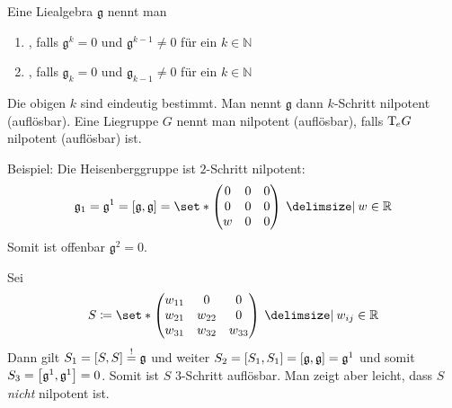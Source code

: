 \begin{definition}
	Eine Liealgebra $\mathfrak{g}$ nennt man
	\begin{enumerate}[1)]
		\item {}, falls $\mathfrak{g}^k=0$ und $\mathfrak{g}^{k-1}\neq 0$ für ein $k \in \mathbb{N}$
		\item {}, falls $\mathfrak{g}_k=0$ und $\mathfrak{g}_{k-1} \neq 0$ für ein $k \in \mathbb{N}$  
	\end{enumerate}
	Die obigen $k$ sind eindeutig bestimmt. 
	Man nennt $\mathfrak{g}$ dann $k$-Schritt nilpotent (auflösbar).
	Eine Liegruppe $G$ nennt man nilpotent (auflösbar), falls $\Tmap_e G$ nilpotent (auflösbar) ist.
\end{definition}

Beispiel: Die Heisenberggruppe ist $2$-Schritt nilpotent:
\[
	\mathfrak{g}_1 = \mathfrak{g}^1 = \benbrace*{\mathfrak{g},\mathfrak{g}} = \set*{\begin{pmatrix}
		0 & 0 & 0 \\
		0 & 0 & 0 \\
		w & 0 & 0
	\end{pmatrix} \given w \in \mathbb{R}}
\]
Somit ist offenbar $\mathfrak{g}^2=0$.

Sei 
\[
	S \coloneqq \set*{\begin{pmatrix}
		w_{11} & 0 & 0 \\
		w_{21} & w_{22} & 0 \\
		w_{31} & w_{32} & w_{33}
	\end{pmatrix} \given w_{ij} \in \mathbb{R}}
\]
Dann gilt $S_1= \benbrace*{S,S}\stackrel{!}{=} \mathfrak{g}$ und weiter
$S_2 = \benbrace*{S_1,S_1} = \benbrace*{\mathfrak{g},\mathfrak{g}} = \mathfrak{g}^1$ und somit $S_3 = \benbrace*{\mathfrak{g}^1,\mathfrak{g}^1} =0$.
Somit ist $S$ $3$-Schritt auflösbar.
Man zeigt aber leicht, dass $S$ \emph{nicht} nilpotent ist.

